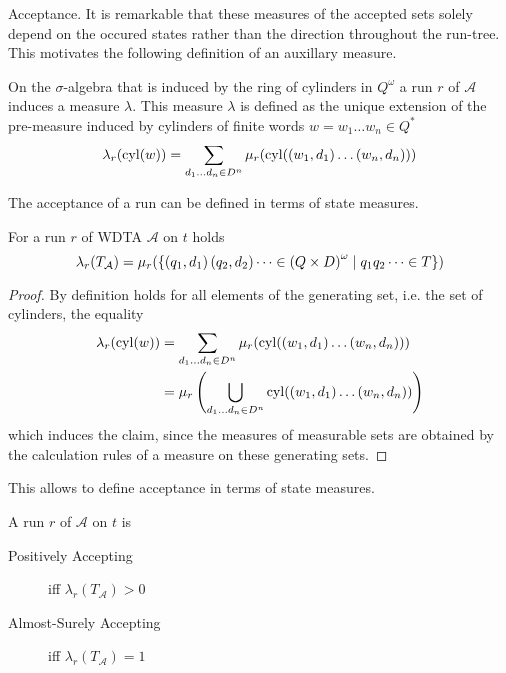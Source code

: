 Acceptance. It is remarkable that these measures of the accepted sets solely
depend on the occured states rather than the direction throughout the run-tree.
This motivates the following definition of an auxillary measure.
\begin{definition}
  On the $\sigma$-algebra that is induced by the ring of cylinders in
  $Q^{\omega}$ a run $r$ of $\mathcal{A}$ induces a measure $\lambda$.
  This measure $\lambda$ is defined as the unique extension of the pre-measure
  induced by cylinders of finite words $w = w_{1}\dots w_{n}\in Q^{*}$
  \begin{equation*}
    \lambda_{r}(\operatorname{cyl}(w)) = \sum\limits_{d_{1}\dots d_{n}\in D^{n}}\mu_{r}(
      \operatorname{cyl}(\left(w_{1}, d_{1}\right)\dots\left(w_{n},d_{n}\right)))
  \end{equation*}
\end{definition}
The acceptance of a run can be defined in terms of state measures.
\begin{lemma}
  For a run $r$ of \ac{WDTA} $\mathcal{A}$ on $t$ holds
  \begin{equation*}
    \lambda_{r}(T_{\mathcal{A}}) = \mu_{r}(\left\{\left(q_{1},d_{1}\right)
    \left(q_{2},d_{2}\right)\dots\in\left(Q\times D\right)^{\omega}\mid q_{1}q_{2}\dots\in T\right\})
  \end{equation*}
\end{lemma}
\begin{proof}
  By definition holds for all elements of the generating set, i.e. the set of
  cylinders, the equality
  \begin{align*}
    \lambda_{r}(\operatorname{cyl}(w)) &= \sum\limits_{d_{1}\dots d_{n}\in D^{n}}\mu_{r}(
      \operatorname{cyl}(\left(w_{1}, d_{1}\right)\dots\left(w_{n},d_{n}\right)))\\
      &= \mu_{r}\left(\bigcup\limits_{d_{1}\dots d_{n}\in D^{n}}
      \operatorname{cyl}(\left(w_{1}, d_{1}\right)\dots\left(w_{n},d_{n}\right))\right)
  \end{align*}
  which induces the claim, since the measures of measurable sets are obtained
  by the calculation rules of a measure on these generating sets.
\end{proof}
This allows to define acceptance in terms of state measures.
\begin{corollary}
  A run $r$ of $\mathcal{A}$ on $t$ is 
  \begin{description}
    \item[Positively Accepting] iff $\lambda_{r}(T_{\mathcal{A}}) > 0$
    \item[Almost-Surely Accepting] iff $\lambda_{r}(T_{\mathcal{A}}) = 1$
  \end{description}
\end{corollary}
